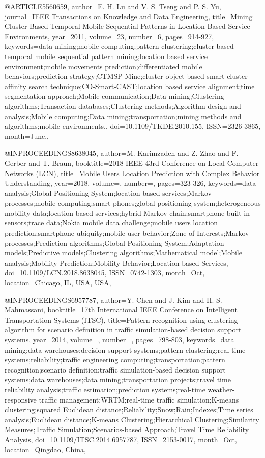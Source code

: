 @ARTICLE{5560659, 
author={E. H. {Lu} and V. S. {Tseng} and P. S. {Yu}}, 
journal={IEEE Transactions on Knowledge and Data Engineering}, 
title={Mining Cluster-Based Temporal Mobile Sequential Patterns in Location-Based Service Environments}, 
year={2011}, 
volume={23}, 
number={6}, 
pages={914-927}, 
keywords={data mining;mobile computing;pattern clustering;cluster based temporal mobile sequential pattern mining;location based service environment;mobile movements prediction;differentiated mobile behaviors;prediction strategy;CTMSP-Mine;cluster object based smart cluster affinity search technique;CO-Smart-CAST;location based service alignment;time segmentation approach;Mobile communication;Data mining;Clustering algorithms;Transaction databases;Clustering methods;Algorithm design and analysis;Mobile computing;Data mining;transportation;mining methods and algorithms;mobile environments.},
doi={10.1109/TKDE.2010.155}, 
ISSN={2326-3865}, 
month={June},},

@INPROCEEDINGS{8638045, 
author={M. {Karimzadeh} and Z. {Zhao} and F. {Gerber} and T. {Braun}}, 
booktitle={2018 IEEE 43rd Conference on Local Computer Networks (LCN)}, 
title={Mobile Users Location Prediction with Complex Behavior Understanding}, 
year={2018}, 
volume={}, 
number={}, 
pages={323-326}, 
keywords={data analysis;Global Positioning System;location based services;Markov processes;mobile computing;smart phones;global positioning system;heterogeneous mobility data;location-based services;hybrid Markov chain;smartphone built-in sensors;trace data;Nokia mobile data challenge;mobile users location prediction;smartphone ubiquity;mobile user behavior;Zone of Interests;Markov processes;Prediction algorithms;Global Positioning System;Adaptation models;Predictive models;Clustering algorithms;Mathematical model;Mobile analysis;Mobility Prediction;Mobility Behavior;Location based Services},
doi={10.1109/LCN.2018.8638045}, 
ISSN={0742-1303}, 
month={Oct},
location={Chicago, IL, USA, USA}},

@INPROCEEDINGS{6957787, 
author={Y. {Chen} and J. {Kim} and H. S. {Mahmassani}}, 
booktitle={17th International IEEE Conference on Intelligent Transportation Systems (ITSC)}, 
title={Pattern recognition using clustering algorithm for scenario definition in traffic simulation-based decision support systems}, 
year={2014}, 
volume={}, 
number={}, 
pages={798-803}, 
keywords={data mining;data warehouses;decision support systems;pattern clustering;real-time systems;reliability;traffic engineering computing;transportation;pattern recognition;scenario definition;traffic simulation-based decision support systems;data warehouses;data mining;transportation projects;travel time reliability analysis;traffic estimation;prediction systems;real-time weather-responsive traffic management;WRTM;real-time traffic simulation;K-means clustering;squared Euclidean distance;Reliability;Snow;Rain;Indexes;Time series analysis;Euclidean distance;K-means Clustering;Hierarchical Clustering;Similarity Measures;Traffic Simulation;Scenarios-based Approach;Travel Time Reliability Analysis}, 
doi={10.1109/ITSC.2014.6957787}, 
ISSN={2153-0017}, 
month={Oct},
location={Qingdao, China}},

